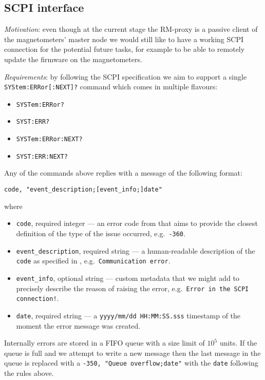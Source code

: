 \subsection{SCPI interface}
\label{subsec:rm-proxy_scpi}

\textit{Motivation}: even though at the current stage the RM-proxy is a passive client of the magnetometers' master node we would still like to have a working SCPI connection for the potential future tasks, for example to be able to remotely update the firmware on the magnetometers.

\textit{Requirements}: by following the SCPI specification \cite{SCPIConsortium1999} we aim to support a single \texttt{SYStem:ERRor[:NEXT]?} command which comes in multiple flavours:

\begin{itemize}
	\item \texttt{SYSTem:ERRor?}
	\item \texttt{SYST:ERR?}
	\item \texttt{SYSTem:ERRor:NEXT?}
	\item \texttt{SYST:ERR:NEXT?}
\end{itemize}

Any of the commands above replies with a message of the following format:
\begin{verbatim}
code, "event_description;[event_info;]date"
\end{verbatim}
where
\begin{itemize}
	\item \texttt{code}, required integer --- an error code from \cite{SCPIConsortium1999} that aims to provide the closest definition of the type of the issue occurred, e.g.\ \texttt{-360}.
	\item \texttt{event\_description}, required string --- a human-readable description of the \texttt{code} as specified in \cite{SCPIConsortium1999}, e.g.\ \texttt{Communication error}.
	\item \texttt{event\_info}, optional string --- custom metadata that we might add to precisely describe the reason of raising the error, e.g.\ \texttt{Error in the SCPI connection!}.
	\item \texttt{date}, required string --- a \texttt{yyyy/mm/dd HH:MM:SS.sss} timestamp \cite{SCPIConsortium1999} of the moment the error message was created.
\end{itemize}

Internally errors are stored in a FIFO queue with a size limit of $10^5$ units. If the queue is full and we attempt to write a new message then the last message in the queue is replaced with a \texttt{-350, "Queue overflow;date"} with the \texttt{date} following the rules above.

